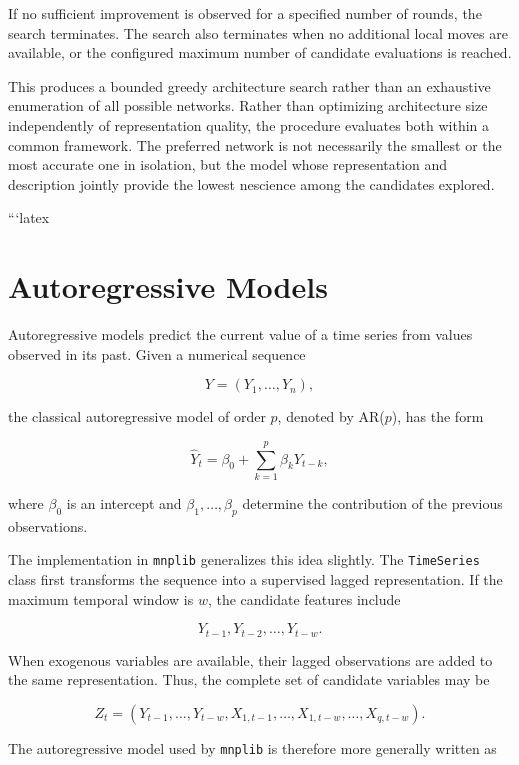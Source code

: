 If no sufficient improvement is observed for a specified number of rounds, the search terminates. The search also terminates when no additional local moves are available, or the configured maximum number of candidate evaluations is reached.

This produces a bounded greedy architecture search rather than an exhaustive enumeration of all possible networks. Rather than optimizing architecture size independently of representation quality, the procedure evaluates both within a common framework. The preferred network is not necessarily the smallest or the most accurate one in isolation, but the model whose representation and description jointly provide the lowest
nescience among the candidates explored.

```latex
%
%

\section{Autoregressive Models}
\label{subsec:automl_autoregressive}

Autoregressive models predict the current value of a time series from values
observed in its past. Given a numerical sequence

\[
Y=(Y_1,\ldots,Y_n),
\]

the classical autoregressive model of order \(p\), denoted by AR(\(p\)), has the
form

\[
\widehat Y_t
=
\beta_0
+
\sum_{k=1}^{p}
\beta_k Y_{t-k},
\]

where \(\beta_0\) is an intercept and
\(\beta_1,\ldots,\beta_p\) determine the contribution of the previous
observations.

The implementation in \texttt{mnplib} generalizes this idea slightly. The
\texttt{TimeSeries} class first transforms the sequence into a supervised lagged
representation. If the maximum temporal window is \(w\), the candidate features
include

\[
Y_{t-1},Y_{t-2},\ldots,Y_{t-w}.
\]

When exogenous variables are available, their lagged observations are added to
the same representation. Thus, the complete set of candidate variables may be

\[
Z_t
=
\left(
Y_{t-1},\ldots,Y_{t-w},
X_{1,t-1},\ldots,X_{1,t-w},
\ldots,
X_{q,t-w}
\right).
\]

The autoregressive model used by \texttt{mnplib} is therefore more generally
written as

